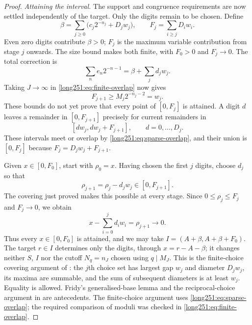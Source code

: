 \begin{proof}
\par\medskip\noindent\emph{Attaining the interval.}
The support and congruence requirements are now settled independently
of the target.  Only the digits remain to be chosen.  Define
\[
 \beta=\sum_{j\ge0}\bigl(c_j2^{-n_j}+D_jw_j\bigr),\qquad
 F_j=\sum_{i\ge j}D_iw_i.
\]
Even zero digits contribute $\beta>0$; $F_j$ is the maximum variable
contribution from stage $j$ onwards.  The size bound makes both finite,
with $F_0>0$ and $F_j\to0$.  The total correction is
\begin{equation}\label{long251:eq:sparse-baseline}
 \sum_ne_n2^{-n-1}=\beta+\sum_jd_jw_j.
\end{equation}
Taking $J\to\infty$ in \eqref{long251:eq:finite-overlap} now gives
\begin{equation}\label{long251:eq:sparse-overlap}
 F_{j+1}\ge M_j2^{-n_j-2}=w_j.
\end{equation}
These bounds do not yet prove that every point of $[0,F_j]$ is
attained.  A digit $d$ leaves a remainder in $[0,F_{j+1}]$ precisely
for current remainders in
\[
 [dw_j,dw_j+F_{j+1}],\qquad d=0,\ldots,D_j.
\]
These intervals meet or overlap by \eqref{long251:eq:sparse-overlap}, and their union
is $[0,F_j]$ because $F_j=D_jw_j+F_{j+1}$.

Given $x\in[0,F_0]$, start with $\rho_0=x$.  Having chosen the first
$j$ digits, choose $d_j$ so that
\[
 \rho_{j+1}=\rho_j-d_jw_j\in[0,F_{j+1}].
\]
The covering just proved makes this possible at every stage.  Since $0\le\rho_j\le F_j$ and $F_j\to0$, we obtain
\[
 x-\sum_{i=0}^{j}d_iw_i=\rho_{j+1}\longrightarrow0.
\]
Thus every $x\in[0,F_0]$ is attained, and we may take
$I=(A+\beta,A+\beta+F_0)$.  The target $r\in I$ determines only the
digits, through $x=r-A-\beta$; it changes neither $S$, $I$ nor the
cutoff $N_q=n_J$ chosen using $q\mid M_J$.
This is the finite-choice covering argument of
\cite[Lemma~4]{crmarickovac2025}: the $j$th choice set has largest gap
$w_j$ and diameter $D_jw_j$, its maxima are summable, and the sum of
subsequent diameters is at least $w_j$.  Equality is allowed.
Fridy's generalised-base lemma
\cite[p.~194]{fridy1966} and the reciprocal-choice argument in
\cite[Lemma~5.1]{kovactao2024} are antecedents.  The finite-choice argument
uses \eqref{long251:eq:sparse-overlap}; the required comparison of moduli
was checked in \eqref{long251:eq:finite-overlap}.


\end{proof}
